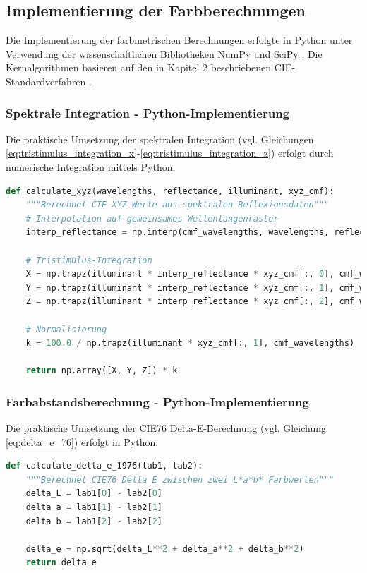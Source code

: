 \subsection{Implementierung der Farbberechnungen}

Die Implementierung der farbmetrischen Berechnungen erfolgte in Python unter Verwendung der wissenschaftlichen Bibliotheken NumPy und SciPy \parencite{NumPy, SciPy}. Die Kernalgorithmen basieren auf den in Kapitel 2 beschriebenen CIE-Standardverfahren \parencite{CIE15:2018}.

\subsubsection{Spektrale Integration - Python-Implementierung}

Die praktische Umsetzung der spektralen Integration (vgl. Gleichungen \ref{eq:tristimulus_integration_x}-\ref{eq:tristimulus_integration_z}) erfolgt durch numerische Integration mittels Python:

\begin{lstlisting}[language=Python, caption={Berechnung der CIE XYZ Tristimuluswerte}]
def calculate_xyz(wavelengths, reflectance, illuminant, xyz_cmf):
    """Berechnet CIE XYZ Werte aus spektralen Reflexionsdaten"""
    # Interpolation auf gemeinsames Wellenlängenraster
    interp_reflectance = np.interp(cmf_wavelengths, wavelengths, reflectance)
    
    # Tristimulus-Integration
    X = np.trapz(illuminant * interp_reflectance * xyz_cmf[:, 0], cmf_wavelengths)
    Y = np.trapz(illuminant * interp_reflectance * xyz_cmf[:, 1], cmf_wavelengths)
    Z = np.trapz(illuminant * interp_reflectance * xyz_cmf[:, 2], cmf_wavelengths)
    
    # Normalisierung
    k = 100.0 / np.trapz(illuminant * xyz_cmf[:, 1], cmf_wavelengths)
    
    return np.array([X, Y, Z]) * k
\end{lstlisting}

\subsubsection{Farbabstandsberechnung - Python-Implementierung}

Die praktische Umsetzung der CIE76 Delta-E-Berechnung (vgl. Gleichung \ref{eq:delta_e_76}) erfolgt in Python:

\begin{lstlisting}[language=Python, caption={CIE76 Delta-E Berechnung}]
def calculate_delta_e_1976(lab1, lab2):
    """Berechnet CIE76 Delta E zwischen zwei L*a*b* Farbwerten"""
    delta_L = lab1[0] - lab2[0]
    delta_a = lab1[1] - lab2[1]
    delta_b = lab1[2] - lab2[2]
    
    delta_e = np.sqrt(delta_L**2 + delta_a**2 + delta_b**2)
    return delta_e
\end{lstlisting}

